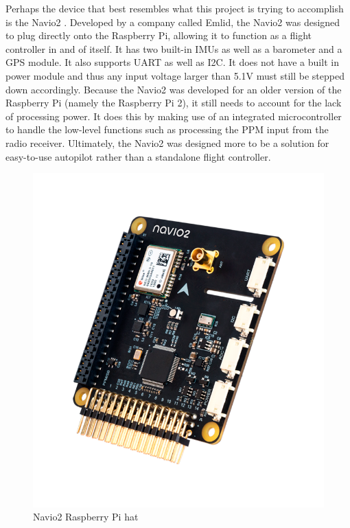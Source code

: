 \documentclass[english]{upeeei}
\begin{document}
\newline
\newline
Perhaps the device that best resembles what this project is trying to accomplish is the Navio2 \cite{Navio2}. Developed by a company called
Emlid, the Navio2 was designed to plug directly onto the Raspberry Pi, allowing it to function as a flight controller in and of itself. It
has two built-in IMUs as well as a barometer and a GPS module. It also supports UART as well as I2C. It does not have a built in power
module and thus any input voltage larger than 5.1V must still be stepped down accordingly. Because the Navio2 was developed for an older
version of the Raspberry Pi (namely the Raspberry Pi 2), it still needs to account for the lack of processing power. It does this by
making use of an integrated microcontroller to handle the low-level functions such as processing the PPM input from the radio receiver.
Ultimately, the Navio2 was designed more to be a solution for easy-to-use autopilot rather than a standalone flight controller. 
\begin{figure}[h]
    \centering
    \includegraphics[scale=0.3]{images/Navio2Elements_main.png}
    \caption{Navio2 Raspberry Pi hat \cite{Navio2}}
    \label{fig:navio2}
\end{figure}
\end{document}
